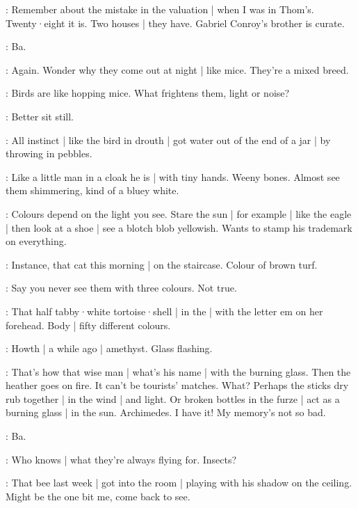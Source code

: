\BloomHist:
Remember about the mistake in the valuation |
when I was in Thom's.
Twenty·eight it is.
Two houses |
they have.
Gabriel Conroy's brother is curate.

\bat:
Ba.

\BloomCurrent:
Again.
Wonder why they come out at night |
like mice.
They're a mixed breed.

\BloomAbstract:
Birds are
like hopping mice.
What frightens them,
light or noise?

\BloomCurrent:
Better sit still.

\BloomAbstract:
All instinct |
like the bird in drouth |
got water out of the end of a jar |
by throwing in pebbles.%

\BloomCurrent:
Like a little man in a cloak he is |
with tiny hands.
Weeny bones.
Almost see them shimmering,
kind of a bluey white.

\BloomAbstract:
Colours depend on the light you see.
Stare the sun |
for example |
like the eagle |
then look at a shoe |
see a blotch blob yellowish.
Wants to stamp his trademark on everything.

\BloomToday:
Instance,
that cat this morning |
on the staircase.
Colour of brown turf.

\BloomAbstract:
Say you never see them with three colours.
Not true.

\BloomHist:
That half tabby·white tortoise·shell |
in the  |
with the letter em on her forehead.
Body |
fifty different colours.

\BloomCurrent:
Howth |
a while ago |
amethyst.
Glass flashing.

\BloomAbstract:
That's how that wise man |
what's his name |
with the burning glass.
Then the heather goes on fire.
It can't be tourists' matches.
What?%
Perhaps the sticks dry rub together |
in the wind |
and light.
Or broken bottles in the furze |
act as a burning glass |
in the sun.
Archimedes.
I have it!
My memory's not so bad.

\bat:
Ba.

\BloomCurrent:
Who knows |
what they're always flying for.
Insects?

\BloomHist:
That bee last week |
got into the room |
playing with his shadow
on the ceiling.
Might be the one bit me,
come back to see.


